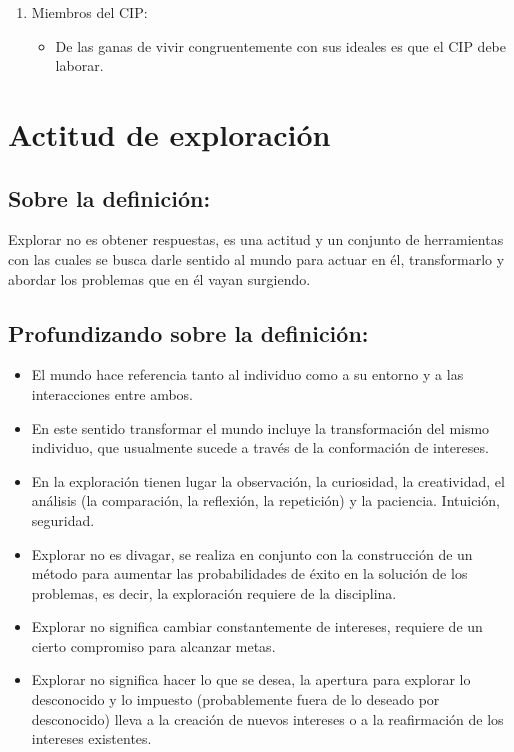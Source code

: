 \documentclass[10pt,letterpaper,oneside]{book}
\begin{document}
\begin{enumerate}[label=\Alph*]
			\item Miembros del CIP:
			\begin{itemize}
			\item De las ganas de vivir congruentemente con sus ideales es que el CIP debe laborar.
			\end{itemize}
			\end{enumerate}


	\section{Actitud de exploración} 

\subsection*{Sobre la definición:}	
		Explorar no es obtener respuestas, es una actitud y un conjunto de herramientas con las cuales se busca darle sentido al mundo para actuar en él, transformarlo y abordar los problemas que en él vayan surgiendo.

		\subsection*{Profundizando sobre la definición:}
		\begin{itemize} 
		\item El mundo hace referencia tanto al individuo como a su entorno y a las interacciones entre ambos. 
		\item En este sentido transformar el mundo incluye la transformación del mismo individuo, que usualmente sucede a través de la conformación de intereses.

\item En la exploración tienen lugar la observación, la curiosidad, la creatividad, el análisis (la comparación, la reflexión, la repetición) y la paciencia. Intuición, seguridad.
\item Explorar no es divagar, se realiza en conjunto con la construcción de un método para aumentar las probabilidades de éxito en la solución de los problemas, es decir, la exploración requiere de la disciplina.
\item Explorar no significa cambiar constantemente de intereses, requiere de un cierto compromiso para alcanzar metas.
\item Explorar no significa hacer lo que se desea, la apertura para explorar lo desconocido y lo impuesto (probablemente fuera de lo deseado por desconocido) lleva a la creación de nuevos intereses o a la reafirmación de los intereses existentes.

\end{itemize}
\end{document}
